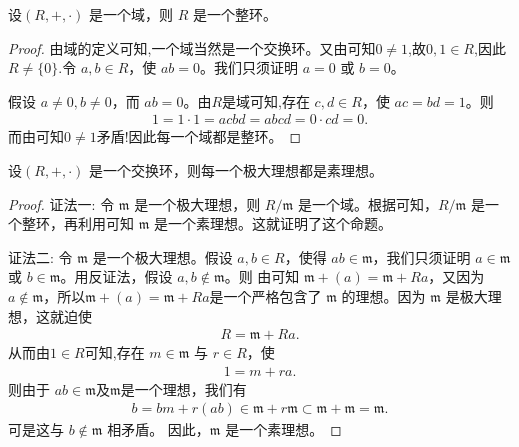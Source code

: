 \documentclass[../../main.tex]{subfiles}
\begin{document}
\begin{lemma}[域一定是整环]\label{lemma:域一定是整环}
设$(R, +, \cdot)$ 是一个域，则 $R$ 是一个整环。
\end{lemma}
\begin{proof}
由域的定义可知,一个域当然是一个交换环。又由可知$0\ne 1$,故$0,1\in R$,因此$R\ne \{0\}.$令 $a, b \in R$，使 $ab = 0$。我们只须证明 $a = 0$ 或 $b = 0$。

假设 $a \neq 0, b \neq 0$，而 $ab = 0$。由$R$是域可知,存在 $c, d \in R$，使 $ac = bd = 1$。则
\begin{align*}
1 = 1 \cdot 1 = acbd = abcd = 0 \cdot cd = 0.
\end{align*}
而由可知$0\ne 1$矛盾!因此每一个域都是整环。
\end{proof}

\begin{proposition}\label{proposition:在交换环中,每一个极大理想都是素理想}
设$(R, +, \cdot)$ 是一个交换环，则每一个极大理想都是素理想。
\end{proposition}
\begin{proof}
{\color{blue}证法一:}
令 $\mathfrak{m}$ 是一个极大理想，则 $R / \mathfrak{m}$ 是一个域。根据可知，$R / \mathfrak{m}$ 是一个整环，再利用可知 $\mathfrak{m}$ 是一个素理想。这就证明了这个命题。

{\color{blue}证法二:}
令 $\mathfrak{m}$ 是一个极大理想。假设 $a, b \in R$，使得 $ab \in \mathfrak{m}$，我们只须证明 $a \in \mathfrak{m}$ 或 $b \in \mathfrak{m}$。用反证法，假设 $a, b \notin \mathfrak{m}$。则 由可知 $\mathfrak{m}+(a)=\mathfrak{m} + Ra $，又因为 $a \notin \mathfrak{m}$，所以$\mathfrak{m}+(a)=\mathfrak{m} + Ra $是一个严格包含了 $\mathfrak{m}$ 的理想。因为 $\mathfrak{m}$ 是极大理想，这就迫使
\begin{align*}
R = \mathfrak{m} + Ra .
\end{align*}
从而由$1\in R$可知,存在 $m \in \mathfrak{m}$ 与 $r \in R$，使
\begin{align*}
1 = m + ra .
\end{align*}
则由于 $ab \in \mathfrak{m}$及$\mathfrak{m}$是一个理想，我们有
\begin{align*}
b = bm + r(ab) \in \mathfrak{m} + r\mathfrak{m} \subset \mathfrak{m} + \mathfrak{m} = \mathfrak{m} .
\end{align*}
可是这与 $b \notin \mathfrak{m}$ 相矛盾。
因此，$\mathfrak{m}$ 是一个素理想。 
\end{proof}
\end{document}

